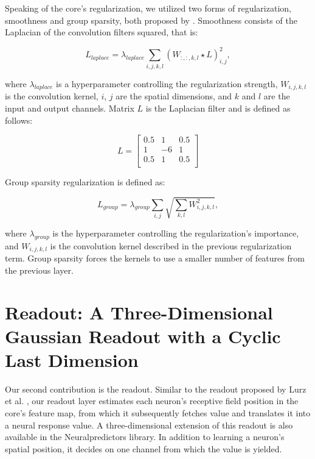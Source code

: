 Speaking of the core’s regularization, we utilized two forms of regularization, smoothness and group sparsity, both proposed by \citep{klindt2017neural}. Smoothness consists of the Laplacian of the convolution filters squared, that is:


\begin{equation}
L_{laplace} = \lambda_{laplace} \sum_{i, j, k, l} (W_{:, :, k, l} \star L)^2_{i, j},
\end{equation}

where $\lambda_{laplace}$ is a hyperparameter controlling the regularization strength, $W_{i, j, k, l}$ is the convolution kernel, $i$, $j$ are the spatial dimensions, and $k$ and $l$ are the input and output channels. Matrix $L$ is the Laplacian filter and is defined as follows:

\begin{equation}
L = \begin{bmatrix}
	0.5 & 1 & 0.5 \\
	1 & -6 & 1 \\
	0.5 & 1 & 0.5 \\
\end{bmatrix}
\end{equation}

Group sparsity regularization is defined as:

\begin{equation}
L_{group} = \lambda_{group} \sum_{i,j} \sqrt{\sum_{k, l} W^2_{i,j,k,l}},
\end{equation}

where $\lambda_{group}$ is the hyperparameter controlling the regularization’s importance, and $W_{i,j,k,l}$ is the convolution kernel described in the previous regularization term. Group sparsity forces the kernels to use a smaller number of features from the previous layer.


\section{Readout: A Three-Dimensional Gaussian Readout with a Cyclic Last Dimension}

Our second contribution is the readout. Similar to the readout proposed by Lurz et al. \citep{lurz2021generalization}, our readout layer estimates each neuron’s receptive field position in the core’s feature map, from which it subsequently fetches value and translates it into a neural response value. A three-dimensional extension of this readout is also available in the Neuralpredictors library. In addition to learning a neuron’s spatial position, it decides on one channel from which the value is yielded. 

